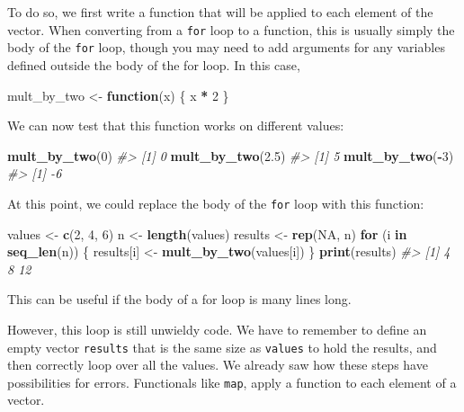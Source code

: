 \documentclass[]{book}
\newenvironment{Shaded}{\begin{snugshade}}{\end{snugshade}}
\newcommand{\CommentTok}[1]{\textcolor[rgb]{0.56,0.35,0.01}{\textit{#1}}}
\newcommand{\ControlFlowTok}[1]{\textcolor[rgb]{0.13,0.29,0.53}{\textbf{#1}}}
\newcommand{\DecValTok}[1]{\textcolor[rgb]{0.00,0.00,0.81}{#1}}
\newcommand{\FloatTok}[1]{\textcolor[rgb]{0.00,0.00,0.81}{#1}}
\newcommand{\KeywordTok}[1]{\textcolor[rgb]{0.13,0.29,0.53}{\textbf{#1}}}
\newcommand{\NormalTok}[1]{#1}
\newcommand{\OperatorTok}[1]{\textcolor[rgb]{0.81,0.36,0.00}{\textbf{#1}}}
\newcommand{\OtherTok}[1]{\textcolor[rgb]{0.56,0.35,0.01}{#1}}
\newcommand{\StringTok}[1]{\textcolor[rgb]{0.31,0.60,0.02}{#1}}
\theoremstyle{definition}
\theoremstyle{definition}
\theoremstyle{definition}
\theoremstyle{remark}
\begin{document}
To do so, we first write a function that will be applied to each element
of the vector. When converting from a \texttt{for} loop to a function,
this is usually simply the body of the \texttt{for} loop, though you may
need to add arguments for any variables defined outside the body of the
for loop. In this case,

\begin{Shaded}
\begin{Highlighting}[]
\NormalTok{mult_by_two <-}\StringTok{ }\ControlFlowTok{function}\NormalTok{(x) \{}
\NormalTok{  x }\OperatorTok{*}\StringTok{ }\DecValTok{2}
\NormalTok{\}}
\end{Highlighting}
\end{Shaded}

We can now test that this function works on different values:

\begin{Shaded}
\begin{Highlighting}[]
\KeywordTok{mult_by_two}\NormalTok{(}\DecValTok{0}\NormalTok{)}
\CommentTok{#> [1] 0}
\KeywordTok{mult_by_two}\NormalTok{(}\FloatTok{2.5}\NormalTok{)}
\CommentTok{#> [1] 5}
\KeywordTok{mult_by_two}\NormalTok{(}\OperatorTok{-}\DecValTok{3}\NormalTok{)}
\CommentTok{#> [1] -6}
\end{Highlighting}
\end{Shaded}

At this point, we could replace the body of the \texttt{for} loop with
this function:

\begin{Shaded}
\begin{Highlighting}[]
\NormalTok{values <-}\StringTok{ }\KeywordTok{c}\NormalTok{(}\DecValTok{2}\NormalTok{, }\DecValTok{4}\NormalTok{, }\DecValTok{6}\NormalTok{)}
\NormalTok{n <-}\StringTok{ }\KeywordTok{length}\NormalTok{(values)}
\NormalTok{results <-}\StringTok{ }\KeywordTok{rep}\NormalTok{(}\OtherTok{NA}\NormalTok{, n)}
\ControlFlowTok{for}\NormalTok{ (i }\ControlFlowTok{in} \KeywordTok{seq_len}\NormalTok{(n)) \{}
\NormalTok{  results[i] <-}\StringTok{ }\KeywordTok{mult_by_two}\NormalTok{(values[i])}
\NormalTok{\}}
\KeywordTok{print}\NormalTok{(results)}
\CommentTok{#> [1]  4  8 12}
\end{Highlighting}
\end{Shaded}

This can be useful if the body of a for loop is many lines long.

However, this loop is still unwieldy code. We have to remember to define
an empty vector \texttt{results} that is the same size as
\texttt{values} to hold the results, and then correctly loop over all
the values. We already saw how these steps have possibilities for
errors. Functionals like \texttt{map}, apply a function to each element
of a vector.
\end{document}
